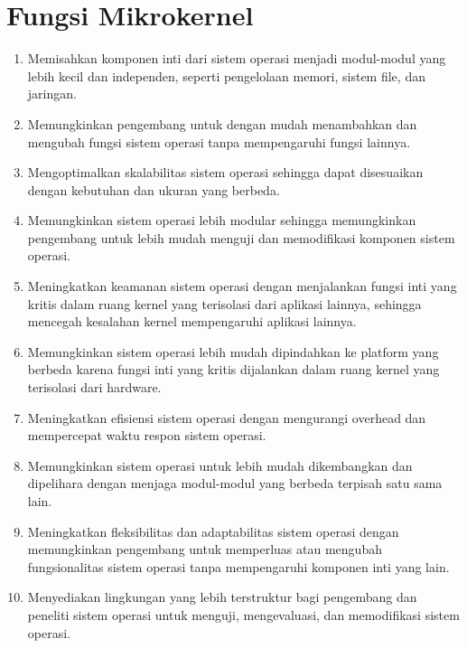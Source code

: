 \documentclass{report}
\begin{document}
	\section*{Fungsi Mikrokernel}
	\begin{enumerate}
		\item Memisahkan komponen inti dari sistem operasi menjadi modul-modul yang lebih kecil dan independen, seperti pengelolaan memori, sistem file, dan jaringan.
		
		\item Memungkinkan pengembang untuk dengan mudah menambahkan dan mengubah fungsi sistem operasi tanpa mempengaruhi fungsi lainnya.
		
		\item Mengoptimalkan skalabilitas sistem operasi sehingga dapat disesuaikan dengan kebutuhan dan ukuran yang berbeda.
		
		\item Memungkinkan sistem operasi lebih modular sehingga memungkinkan pengembang untuk lebih mudah menguji dan memodifikasi komponen sistem operasi.
		
		\item Meningkatkan keamanan sistem operasi dengan menjalankan fungsi inti yang kritis dalam ruang kernel yang terisolasi dari aplikasi lainnya, sehingga mencegah kesalahan kernel mempengaruhi aplikasi lainnya.
		
		\item Memungkinkan sistem operasi lebih mudah dipindahkan ke platform yang berbeda karena fungsi inti yang kritis dijalankan dalam ruang kernel yang terisolasi dari hardware.
		
		\item Meningkatkan efisiensi sistem operasi dengan mengurangi overhead dan mempercepat waktu respon sistem operasi.
		
		\item Memungkinkan sistem operasi untuk lebih mudah dikembangkan dan dipelihara dengan menjaga modul-modul yang berbeda terpisah satu sama lain.
		
		\item Meningkatkan fleksibilitas dan adaptabilitas sistem operasi dengan memungkinkan pengembang untuk memperluas atau mengubah fungsionalitas sistem operasi tanpa mempengaruhi komponen inti yang lain.
		
		\item Menyediakan lingkungan yang lebih terstruktur bagi pengembang dan peneliti sistem operasi untuk menguji, mengevaluasi, dan memodifikasi sistem operasi.
	\end{enumerate}
\end{document}
